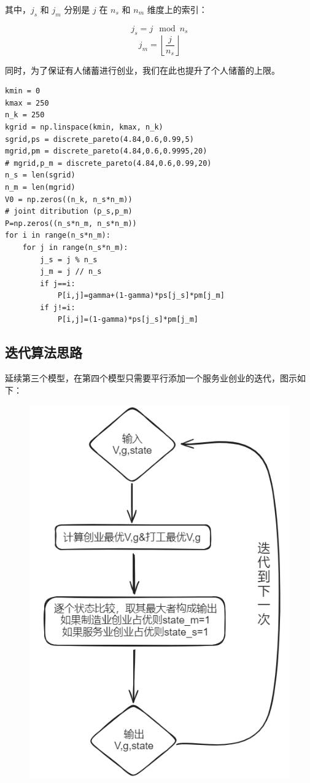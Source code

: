 \documentclass[a4paper, 12pt]{ctexart}
\begin{document}
其中，\(j_s\) 和 \(j_m\) 分别是 \(j\) 在 \(n_s\) 和 \(n_m\) 维度上的索引：

\[
j_s = j \mod n_s
\]
\[
j_m = \left\lfloor \frac{j}{n_s} \right\rfloor
\]

同时，为了保证有人储蓄进行创业，我们在此也提升了个人储蓄的上限。
\begin{lstlisting}
kmin = 0
kmax = 250
n_k = 250
kgrid = np.linspace(kmin, kmax, n_k)
sgrid,ps = discrete_pareto(4.84,0.6,0.99,5)
mgrid,pm = discrete_pareto(4.84,0.6,0.9995,20)
# mgrid,p_m = discrete_pareto(4.84,0.6,0.99,20)
n_s = len(sgrid)
n_m = len(mgrid)
V0 = np.zeros((n_k, n_s*n_m))
# joint ditribution (p_s,p_m)
P=np.zeros((n_s*n_m, n_s*n_m))
for i in range(n_s*n_m):
    for j in range(n_s*n_m):
        j_s = j % n_s
        j_m = j // n_s
        if j==i:
            P[i,j]=gamma+(1-gamma)*ps[j_s]*pm[j_m]
        if j!=i:
            P[i,j]=(1-gamma)*ps[j_s]*pm[j_m]
\end{lstlisting}

\subsection{迭代算法思路}
延续第三个模型，在第四个模型只需要平行添加一个服务业创业的迭代，图示如下：
\begin{figure}[h]
    \centering
    \includegraphics[width=0.4\linewidth]{pic/algor3.png}
    \nonumber
    \label{fig:enter-label}
\end{figure}
\end{document}
